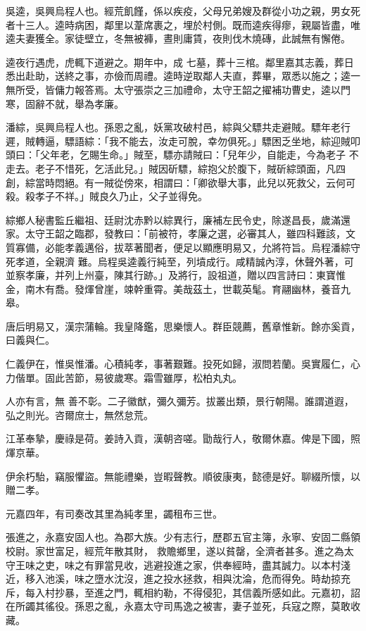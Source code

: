 \begin{pinyinscope}
 吳逵，吳興烏程人也。經荒飢饉，係以疾疫，父母兄弟嫂及群從小功之親，男女死者十三人。逵時病困，鄰里以葦席裹之，埋於村側。既而逵疾得瘳，親屬皆盡，唯逵夫妻獲全。家徒壁立，冬無被褲，晝則庸賃，夜則伐木燒磚，此誠無有懈倦。



 逵夜行遇虎，虎輒下道避之。期年中，成
 七墓，葬十三棺。鄰里嘉其志義，葬日悉出赴助，送終之事，亦儉而周禮。逵時逆取鄰人夫直，葬畢，眾悉以施之；逵一無所受，皆傭力報答焉。太守張崇之三加禮命，太守王韶之擢補功曹史，逵以門寒，固辭不就，舉為孝廉。



 潘綜，吳興烏程人也。孫恩之亂，妖黨攻破村邑，綜與父驃共走避賊。驃年老行遲，賊轉逼，驃語綜：「我不能去，汝走可脫，幸勿俱死。」驃困乏坐地，綜迎賊叩頭曰：「父年老，乞賜生命。」賊至，驃亦請賊曰：「兒年少，自能走，今為老子
 不走去。老子不惜死，乞活此兒。」賊因斫驃，綜抱父於腹下，賊斫綜頭面，凡四創，綜當時悶絕。有一賊從傍來，相謂曰：「卿欲舉大事，此兒以死救父，云何可殺。殺孝子不祥。」賊良久乃止，父子並得免。


綜鄉人秘書監丘繼祖、廷尉沈赤黔以綜異行，廉補左民令史，除遂昌長，歲滿還家。太守王韶之臨郡，發教曰：「前被符，孝廉之選，必審其人，雖四科難該，文質寡備，必能孝義邁俗，拔萃著聞者，便足以顯應明易又，允將符旨。烏程潘綜守死孝道，全親濟
 難。烏程吳逵義行純至，列墳成行。咸精誠內淳，休聲外著，可並察孝廉，并列上州臺，陳其行跡。」及將行，設祖道，贈以四言詩曰：東寶惟金，南木有喬。發煇曾崖，竦幹重霄。美哉茲土，世載英髦。育翮幽林，養音九皋。


唐后明易又，漢宗蒲輪。我皇降鑑，思樂懷人。群臣競薦，舊章惟新。餘亦奚貢，曰義與仁。


仁義伊在，惟吳惟潘。心積純孝，事著艱難。投死如歸，淑問若蘭。吳實履仁，心力偕單。固此苦節，易彼歲寒。霜雪雖厚，松柏丸丸。


人亦有言，無
 善不彰。二子徽猷，彌久彌芳。拔叢出類，景行朝陽。誰謂道遐，弘之則光。咨爾庶士，無然怠荒。


江革奉摯，慶祿是荷。姜詩入貢，漢朝咨嗟。勖哉行人，敬爾休嘉。俾是下國，照煇京華。


伊余朽駘，竊服懼盜。無能禮樂，豈暇聲教。順彼康夷，懿德是好。聊綴所懷，以贈二孝。



 元嘉四年，有司奏改其里為純孝里，蠲租布三世。



 張進之，永嘉安固人也。為郡大族。少有志行，歷郡五官主簿，永寧、安固二縣領校尉。家世富足，經荒年散其財，
 救贍鄉里，遂以貧罄，全濟者甚多。進之為太守王味之吏，味之有罪當見收，逃避投進之家，供奉經時，盡其誠力。以本村淺近，移入池溪，味之墮水沈沒，進之投水拯救，相與沈淪，危而得免。時劫掠充斥，每入村抄暴，至進之門，輒相約勒，不得侵犯，其信義所感如此。元嘉初，詔在所蠲其徭役。孫恩之亂，永嘉太守司馬逸之被害，妻子並死，兵寇之際，莫敢收藏。




\end{pinyinscope}
